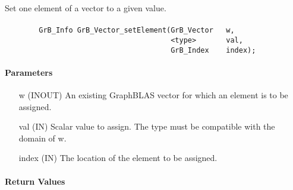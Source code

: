 Set one element of a vector to a given value.

\paragraph{\syntax}

\begin{verbatim}
        GrB_Info GrB_Vector_setElement(GrB_Vector   w,
                                       <type>       val,
                                       GrB_Index    index);
\end{verbatim}

\paragraph{Parameters}

\begin{itemize}[leftmargin=1.1in]
    \item[{\sf w}]   ({\sf INOUT}) An existing GraphBLAS vector for which an 
    element is to be assigned.

    \item[{\sf val}]   ({\sf IN}) Scalar value to assign.  The type must
    be compatible with the domain of {\sf w}.

    \item[{\sf index}] ({\sf IN}) The location of the element to be assigned.
\end{itemize}

\paragraph{Return Values}


